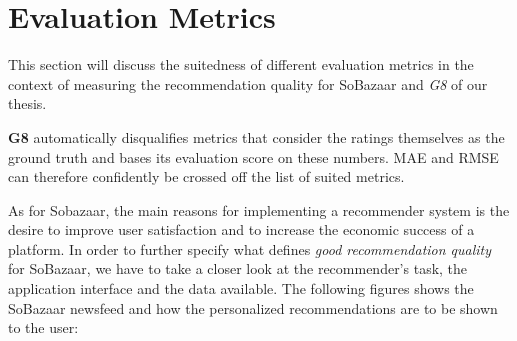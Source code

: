 \section{Evaluation Metrics}
\label{sec:eval-metrics}


This section will discuss the suitedness of different evaluation metrics in the context
of measuring the recommendation quality for SoBazaar and \emph{G8} of our thesis.

\textbf{G8} automatically disqualifies metrics that consider the ratings themselves as the
ground truth and bases its evaluation score on these numbers. MAE and RMSE can therefore
confidently be crossed off the list of suited metrics.

As for Sobazaar, the main reasons for implementing a recommender system is the desire to improve user
satisfaction and to increase the economic success of a platform. In order to further specify what
defines \emph{good recommendation quality} for SoBazaar, we have to take a closer look at the
recommender's task, the application interface and the data available. The following figures
shows the SoBazaar newsfeed and how the personalized recommendations are to be shown to the user:

